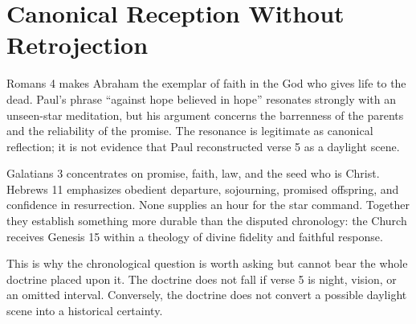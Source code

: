 \section{Canonical Reception Without Retrojection}

Romans 4 makes Abraham the exemplar of faith in the God who gives life to the
dead. Paul's phrase ``against hope believed in hope'' resonates strongly with
an unseen-star meditation, but his argument concerns the barrenness of the
parents and the reliability of the promise. The resonance is legitimate as
canonical reflection; it is not evidence that Paul reconstructed verse 5 as a
daylight scene.

Galatians 3 concentrates on promise, faith, law, and the seed who is Christ.
Hebrews 11 emphasizes obedient departure, sojourning, promised offspring, and
confidence in resurrection. None supplies an hour for the star command.
Together they establish something more durable than the disputed chronology:
the Church receives Genesis 15 within a theology of divine fidelity and
faithful response.

This is why the chronological question is worth asking but cannot bear the
whole doctrine placed upon it. The doctrine does not fall if verse 5 is night,
vision, or an omitted interval. Conversely, the doctrine does not convert a
possible daylight scene into a historical certainty.

